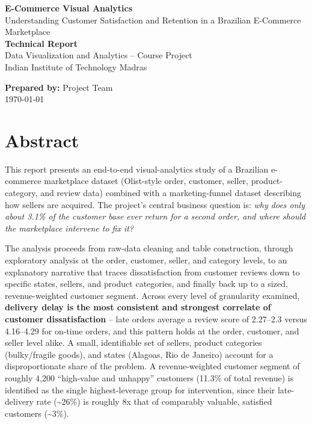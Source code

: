\documentclass[11pt,a4paper]{report}
\begin{document}
\begin{titlepage}
    \centering
    \vspace*{2cm}
    {\LARGE \textbf{E-Commerce Visual Analytics}}\\[0.5cm]
    {\Large Understanding Customer Satisfaction and Retention in a Brazilian E-Commerce Marketplace}\\[2cm]

    {\large \textbf{Technical Report}}\\[0.3cm]
    {\large Data Visualization and Analytics -- Course Project}\\[0.3cm]
    {\large Indian Institute of Technology Madras}\\[2cm]

    \vfill

    {\large \textbf{Prepared by:} Project Team}\\[0.2cm]
    {\large \today}

\end{titlepage}

\tableofcontents
\listoffigures
\clearpage

\chapter*{Abstract}

This report presents an end-to-end visual-analytics study of a Brazilian e-commerce marketplace
dataset (Olist-style order, customer, seller, product-category, and review data) combined with a
marketing-funnel dataset describing how sellers are acquired. The project's central business
question is: \textit{why does only about 3.1\% of the customer base ever return for a second
order, and where should the marketplace intervene to fix it?}

The analysis proceeds from raw-data cleaning and table construction, through exploratory analysis
at the order, customer, seller, and category levels, to an explanatory narrative that traces
dissatisfaction from customer reviews down to specific states, sellers, and product categories,
and finally back up to a sized, revenue-weighted customer segment. Across every level of
granularity examined, \textbf{delivery delay is the most consistent and strongest correlate of
customer dissatisfaction} -- late orders average a review score of 2.27--2.3 versus 4.16--4.29 for
on-time orders, and this pattern holds at the order, customer, and seller level alike. A small,
identifiable set of sellers, product categories (bulky/fragile goods), and states (Alagoas, Rio de
Janeiro) account for a disproportionate share of the problem. A revenue-weighted customer segment
of roughly 4{,}200 ``high-value and unhappy'' customers (11.3\% of total revenue) is identified as
the single highest-leverage group for intervention, since their late-delivery rate
(\textasciitilde26\%) is roughly 8x that of comparably valuable, satisfied customers
(\textasciitilde3\%).
\end{document}
